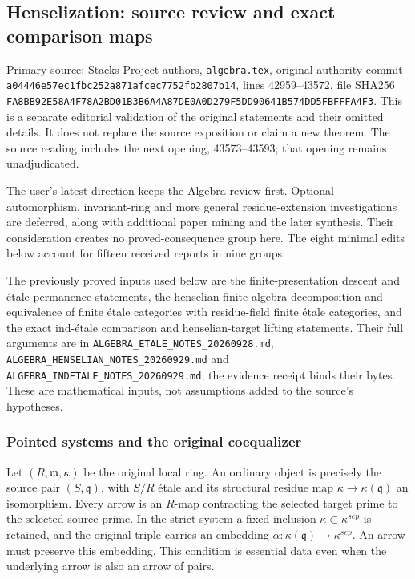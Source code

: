 \subsection{Henselization: source review and exact comparison maps}\label{algebra-proof-060-henselization-source-review-and-exact-comparison-maps}

Primary source: Stacks Project authors, \texttt{algebra.tex}, original authority commit \texttt{a04446e57ec1fbc252a871afcec7752fb2807b14}, lines 42959--43572, file SHA256 \texttt{FA8BB92E58A4F78A2BD01B3B6A4A87DE0A0D279F5DD90641B574DD5FBFFFA4F3}. This is a separate editorial validation of the original statements and their omitted details. It does not replace the source exposition or claim a new theorem. The source reading includes the next opening, 43573--43593; that opening remains unadjudicated.

The user's latest direction keeps the Algebra review first. Optional automorphism, invariant-ring and more general residue-extension investigations are deferred, along with additional paper mining and the later synthesis. Their consideration creates no proved-consequence group here. The eight minimal edits below account for fifteen received reports in nine groups.

The previously proved inputs used below are the finite-presentation descent and étale permanence statements, the henselian finite-algebra decomposition and equivalence of finite étale categories with residue-field finite étale categories, and the exact ind-étale comparison and henselian-target lifting statements. Their full arguments are in \texttt{ALGEBRA\_ETALE\_NOTES\_20260928.md}, \texttt{ALGEBRA\_HENSELIAN\_NOTES\_20260929.md} and \texttt{ALGEBRA\_INDETALE\_NOTES\_20260929.md}; the evidence receipt binds their bytes. These are mathematical inputs, not assumptions added to the source's hypotheses.

\subsubsection{Pointed systems and the original coequalizer}\label{algebra-proof-060-pointed-systems-and-the-original-coequalizer}

Let \((R,\mathfrak m,\kappa)\) be the original local ring. An ordinary object is precisely the source pair \((S,\mathfrak q)\), with \(S/R\) étale and its structural residue map \(\kappa\to\kappa(\mathfrak q)\) an isomorphism. Every arrow is an \(R\)-map contracting the selected target prime to the selected source prime. In the strict system a fixed inclusion \(\kappa\subset\kappa^{sep}\) is retained, and the original triple carries an embedding \(\alpha:\kappa(\mathfrak q)\to\kappa^{sep}\). An arrow must preserve this embedding. This condition is essential data even when the underlying arrow is also an arrow of pairs.

